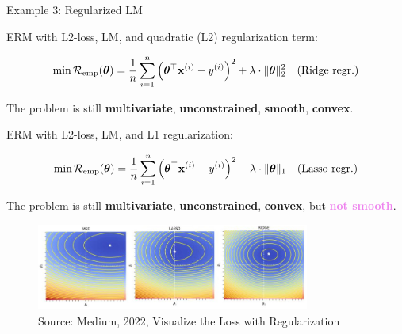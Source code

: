 \begin{vbframe}{Example 3: Regularized LM}

\begin{footnotesize}

ERM with L2-loss, LM, and quadratic (L2) regularization term: 

\vspace*{-0.2cm}

$$
	\min \mathcal{R}_{\text{emp}}(\bm{\theta}) = \frac{1}{n}\sum\limits_{i=1}^n \left(\bm{\theta}^\top \mathbf{x}^{(i)} - y^{(i)}\right)^2  + \lambda \cdot \|\bm{\theta}\|_2^2 \quad \text{(Ridge regr.)}
$$

\vspace*{-0.1cm}


The problem is still \textbf{multivariate}, \textbf{unconstrained}, \textbf{smooth}, \textbf{convex}.

\vspace*{0.1cm}

ERM with L2-loss, LM, and L1 regularization: 

\vspace*{-0.2cm}

$$
	\min \mathcal{R}_{\text{emp}}(\bm{\theta}) = \frac{1}{n}\sum\limits_{i=1}^n \left(\bm{\theta}^\top \mathbf{x}^{(i)} - y^{(i)}\right)^2  + \lambda \cdot \|\bm{\theta}\|_1 \quad \text{(Lasso regr.)}
$$

\vspace*{-0.1cm}

The problem is still \textbf{multivariate}, \textbf{unconstrained}, \textbf{convex}, but \textcolor{violet}{\textbf{not smooth}}. %

\vspace*{-0.3cm}

\begin{figure}
\begin{center}
	\includegraphics[width=0.8\textwidth]{figure_man/lasso-ridge_medium.jpg}
\end{center}
	\caption{Source: Medium, 2022, Visualize the Loss with Regularization}
\end{figure}

\end{footnotesize}

\end{vbframe}


